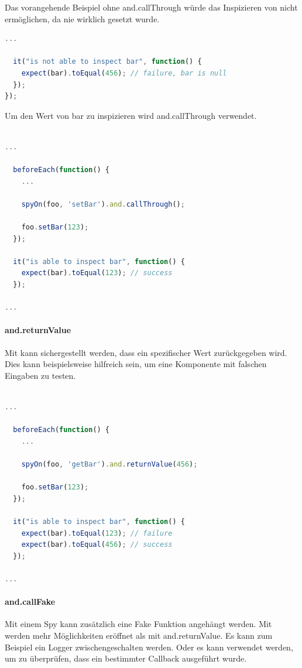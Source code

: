 Das vorangehende Beispiel ohne and.callThrough würde das Inspizieren von  nicht ermöglichen, da  nie wirklich gesetzt wurde.
\begin{lstlisting}[language=JavaScript]
  ...

  it("is not able to inspect bar", function() {
    expect(bar).toEqual(456); // failure, bar is null
  });
});
\end{lstlisting}

Um den Wert von bar zu inspizieren wird and.callThrough verwendet.
\begin{lstlisting}[language=JavaScript]

...

  beforeEach(function() {
    ...

    spyOn(foo, 'setBar').and.callThrough();

    foo.setBar(123);
  });

  it("is able to inspect bar", function() {
    expect(bar).toEqual(123); // success
  });

...

\end{lstlisting}

\paragraph{and.returnValue}
Mit  kann sichergestellt werden, dass ein spezifischer Wert zurückgegeben wird. Dies kann beispielsweise hilfreich sein, um eine Komponente mit falschen Eingaben zu testen.

\begin{lstlisting}[language=JavaScript]

...

  beforeEach(function() {
    ...

    spyOn(foo, 'getBar').and.returnValue(456);

    foo.setBar(123);
  });

  it("is able to inspect bar", function() {
    expect(bar).toEqual(123); // failure
    expect(bar).toEqual(456); // success
  });

...

\end{lstlisting}

\paragraph{and.callFake}
Mit einem Spy kann zusätzlich eine Fake Funktion angehängt werden. Mit  werden mehr Möglichkeiten eröffnet als mit and.returnValue. Es kann zum Beispiel ein Logger zwischengeschalten werden. Oder es kann verwendet werden, um zu überprüfen, dass ein bestimmter Callback ausgeführt wurde.

